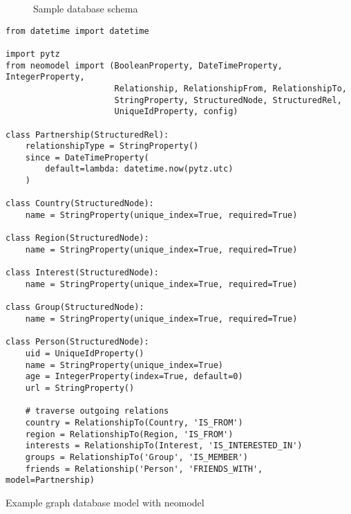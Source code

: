 \begin{figure}[h]
    \caption{Sample database schema}
    \label{fig:graphdb:graphmodel}
\end{figure}


\begin{listing}[ht]
\begin{verbatim}
from datetime import datetime

import pytz
from neomodel import (BooleanProperty, DateTimeProperty, IntegerProperty,
                      Relationship, RelationshipFrom, RelationshipTo,
                      StringProperty, StructuredNode, StructuredRel,
                      UniqueIdProperty, config)

class Partnership(StructuredRel):
    relationshipType = StringProperty()
    since = DateTimeProperty(
        default=lambda: datetime.now(pytz.utc)
    )

class Country(StructuredNode):
    name = StringProperty(unique_index=True, required=True)

class Region(StructuredNode):
    name = StringProperty(unique_index=True, required=True)

class Interest(StructuredNode):
    name = StringProperty(unique_index=True, required=True)

class Group(StructuredNode):
    name = StringProperty(unique_index=True, required=True)

class Person(StructuredNode):
    uid = UniqueIdProperty()
    name = StringProperty(unique_index=True)
    age = IntegerProperty(index=True, default=0)
    url = StringProperty()

    # traverse outgoing relations
    country = RelationshipTo(Country, 'IS_FROM')
    region = RelationshipTo(Region, 'IS_FROM')
    interests = RelationshipTo(Interest, 'IS_INTERESTED_IN')
    groups = RelationshipTo('Group', 'IS_MEMBER')
    friends = Relationship('Person', 'FRIENDS_WITH', model=Partnership)
\end{verbatim}
\caption{Example graph database model with neomodel}
\label{lst:graphdb:neomodel}
\end{listing}

